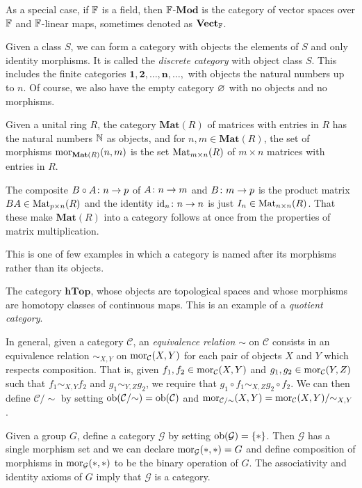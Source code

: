 As a special case, if $\mathbb{F}$ is a field, then $\mathbb{F}$-$\mathbf{Mod}$ is the category of vector spaces over $\mathbb{F}$ and $\mathbb{F}$-linear maps, sometimes denoted as $\mathbf{Vect}_{\mathbb{F}}$. 
\item Given a class $S$, we can form a category with objects the elements of $S$ and only identity morphisms. It is called the \emph{discrete category} with object class $S$. This includes the finite categories $\mathbf{1}, \mathbf{2},\ldots, \mathbf{n},\ldots,$ with objects the natural numbers up to $n$. Of course, we also have the empty category $\varnothing$ with no objects and no morphisms.  
\item Given a unital ring $R$, the category $\mathbf{Mat}(R)$ of matrices with entries in $R$ has the natural numbers $\mathbb{N}$ as objects, and for $n,m\in \mathbf{Mat}(R)$, the set of morphisms $\operatorname{mor}_{\mathbf{Mat}(R)}(n,m)$ is the set $\mathrm{Mat}_{m\times n}(R)$ of $m\times n$ matrices with entries in $R$.

The composite $B\circ A\colon n\to p$ of $A\colon n\to m$ and $B\colon m\to p$ is the product matrix $BA\in\mathrm{Mat}_{p\times n}(R)$ and the identity $\mathrm{id}_n\colon n\to n$ is just $I_n\in \mathrm{Mat}_{n\times n}(R)$. That these make $\mathbf{Mat}(R)$ into a category follows at once from the properties of matrix multiplication.

This is one of few examples in which a category is named after its morphisms rather than its objects.
\item The category $\mathbf{hTop}$, whose objects are topological spaces and whose morphisms are homotopy classes of continuous maps. This is an example of a \emph{quotient category}.

In general, given a category $\mathcal{C}$, an \emph{equivalence relation} $\sim$ on $\mathcal{C}$ consists in an equivalence relation $\sim_{X,Y}$ on $\operatorname{mor}_{\mathcal{C}}(X,Y)$ for each pair of objects $X$ and $Y$ which respects composition. That is, given $f_1,f_2\in\operatorname{mor}_{\mathcal{C}}(X,Y)$ and $g_1,g_2\in\operatorname{mor}_{\mathcal{C}}(Y,Z)$ such that $f_1\sim_{X,Y}f_2$ and $g_1\sim_{Y,Z}g_2$, we require that $g_1\circ f_1\sim_{X,Z}g_2\circ f_2$. We can then define $\mathcal{C}/{\sim}$ by setting $\operatorname{ob}(\mathcal{C}/{\sim})=\operatorname{ob}(\mathcal{C})$ and $\operatorname{mor}_{\mathcal{C}/{\sim}}(X,Y)=\operatorname{mor}_{\mathcal{C}}(X,Y)/{\sim_{X,Y}}$. 
\een
\item Given a group $G$, define a category $\mathcal{G}$ by setting $\operatorname{ob}(\mathcal{G})=\{*\}$. Then $\mathcal{G}$ has a single morphism set and we can declare $\operatorname{mor}_{\mathcal{G}}(*,*)=G$ and define composition of morphisms in $\operatorname{mor}_{\mathcal{G}}(*,*)$ to be the binary operation of $G$. The associativity and identity axioms of $G$ imply that $\mathcal{G}$ is a category. 

